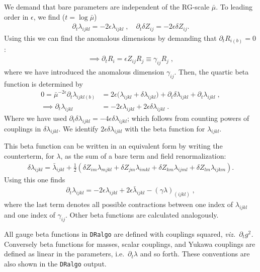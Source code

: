 \documentclass[11pt]{article}
\def\dralgo{{\tt DRalgo}}
\newcommand{\bmu}{\bar\mu}
\renewcommand{\nn}{\nonumber \\}
\begin{document}
We demand that bare parameters are independent of the RG-scale $\bmu$.
To leading order in $\epsilon$, we find
($t = \log \bmu$)
\begin{align}
  \partial_{t}\lambda_{ijkl} =
  - 2\epsilon \lambda_{ijkl}
\;, \quad
\partial_{t}\delta Z_{ij}=-2 \epsilon \delta Z_{ij}.
\end{align}
Using this we can find the anomalous dimensions by demanding that
$\partial_{t}^{ } R_{i(b)}=0$:
\begin{align}
\implies \partial_{t}{R}_i=
  \epsilon Z_{ij} R_j\equiv \gamma_{ij} R_j
  \;,
\end{align}
where we have introduced the anomalous dimension $\gamma_{ij}$.
Then, the quartic beta function is determined by
\begin{align}
  0 = 
  \bmu^{-2\epsilon}\partial_{t}\lambda_{ijkl(b)} &=
    2\epsilon\bigl(\lambda_{ijkl} + \delta\lambda_{ijkl}\bigr)
  + \partial_{t}\delta\lambda_{ijkl}
  + \partial_{t}\lambda_{ijkl}
  \;,\nn
  \implies  \partial_{t}\lambda_{ijkl} &= 
  - 2\epsilon \lambda_{ijkl}
  + 2\epsilon \delta \lambda_{ijkl}
  \;.
\end{align}
Where we have used
$\partial_{t}\delta\lambda_{ijkl}=-4\epsilon \delta\lambda_{ijkl}$;
which follows from counting powers of couplings in
$\delta\lambda_{ijkl}$. We identify
$2\epsilon \delta \lambda_{ijkl}$ with the beta function for
$\lambda_{ijkl}$.

This beta function can be written in an equivalent form by writing the counterterm, for $\lambda$, as the sum of a bare term and field renormalization:
\begin{align}
  \delta \lambda_{ijkl}=\bar{\lambda}_{ijkl}+\frac{1}{2}\left(
    \delta Z_{i m}\lambda_{m j k l}
  + \delta Z_{j m}\lambda_{i m k l}
  + \delta Z_{k m}\lambda_{i j m l}
  + \delta Z_{l m}\lambda_{i j k m}
  \right).
\end{align}
Using this one finds
\begin{align}
\partial_{t}{\lambda}_{ijkl}=
  - 2\epsilon \lambda_{ijkl}
  + 2\epsilon \bar{\lambda}_{ijkl}
  - (\gamma \lambda)_{(ijkl)}
  \;,
\end{align}
where the last term denotes all possible contractions between one index of
$\lambda_{ijkl}$ and one index of
$\gamma_{ij}$.
Other beta functions are calculated analogously.

All gauge beta functions in \dralgo{} are defined with couplings squared,
{\em viz.~$\partial_t^{ } g^2$.}
Conversely beta functions for
masses,
scalar couplings, and
Yukawa couplings are defined
as linear in the parameters, i.e.\
$\partial_t \lambda$ and so forth.
These conventions are also shown in the \dralgo{} output.
\end{document}
